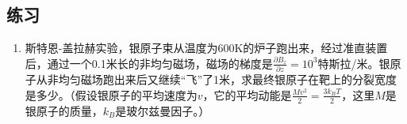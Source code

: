 \subsection*{练习}

\begin{enumerate}
\item 

斯特恩-盖拉赫实验，银原子束从温度为600K的炉子跑出来，经过准直装置后，通过一个0.1米长的非均匀磁场，磁场的梯度是$\frac{\partial B_z}{\partial z} = 10^3$特斯拉/米。银原子从非均匀磁场跑出来后又继续“飞”了1米，求最终银原子在靶上的分裂宽度是多少。（假设银原子的平均速度为$v$，它的平均动能是$\frac{M v^2}{2} = \frac{3 k_B T}{2}$，这里$M$是银原子的质量，$k_B$是玻尔兹曼因子。）

\end{enumerate}

